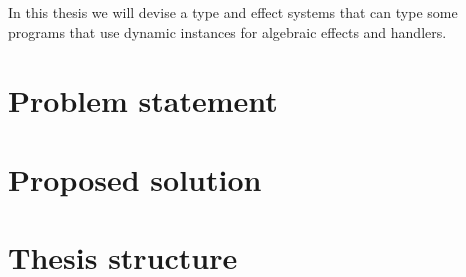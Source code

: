 In this thesis we will devise a type and effect systems that can type some programs that use dynamic instances for algebraic effects and handlers.

\section{Problem statement}
\section{Proposed solution}
\section{Thesis structure}
